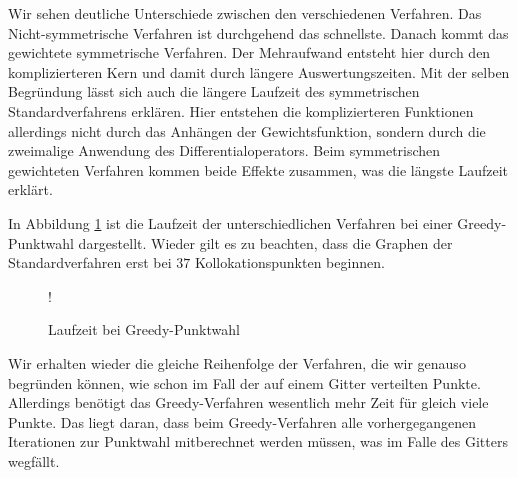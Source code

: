 Wir sehen deutliche Unterschiede zwischen den verschiedenen Verfahren. Das Nicht-symmetrische Verfahren ist durchgehend das schnellste. Danach kommt das gewichtete symmetrische Verfahren. Der Mehraufwand entsteht hier durch den komplizierteren Kern und damit durch längere Auswertungszeiten. Mit der selben Begründung lässt sich auch die längere Laufzeit des symmetrischen Standardverfahrens erklären. Hier entstehen die komplizierteren Funktionen allerdings nicht durch das Anhängen der Gewichtsfunktion, sondern durch die zweimalige Anwendung des Differentialoperators. Beim symmetrischen gewichteten Verfahren kommen beide Effekte zusammen, was die längste Laufzeit erklärt.

In Abbildung \ref{fig:Laufzeit-greedy} ist die Laufzeit der unterschiedlichen Verfahren bei einer Greedy-Punktwahl dargestellt. Wieder gilt es zu beachten, dass die Graphen der Standardverfahren erst bei $37$ Kollokationspunkten beginnen.
\begin{figure}[ht]
\centering
\resizebox {\columnwidth} {!} {

}
\caption{Laufzeit bei Greedy-Punktwahl}
\label{fig:Laufzeit-greedy}
\end{figure}

Wir erhalten wieder die gleiche Reihenfolge der Verfahren, die wir genauso begründen können, wie schon im Fall der auf einem Gitter verteilten Punkte. Allerdings benötigt das Greedy-Verfahren wesentlich mehr Zeit für gleich viele Punkte. Das liegt daran, dass beim Greedy-Verfahren alle vorhergegangenen Iterationen zur Punktwahl mitberechnet werden müssen, was im Falle des Gitters wegfällt.